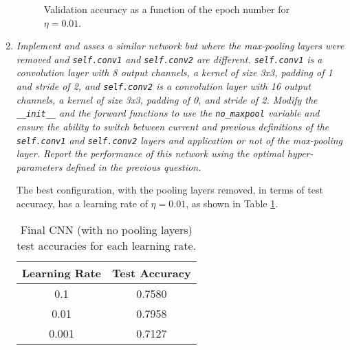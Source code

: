 \documentclass[12pt]{article}
\begin{document}
\begin{enumerate}[leftmargin=\labelsep]
          \begin{figure}[H]
              \centering
              
              \caption{Validation accuracy as a function of the epoch number for $\eta = 0.01$.}
              \label{fig:cnn-validation-accuracy-0.01-0.7-0-sgd-false}
          \end{figure}

    \item \textit{Implement and asses a similar network but where the max-pooling layers were removed and \texttt{self.conv1} and \texttt{self.conv2} are different. \texttt{self.conv1} is a convolution layer with 8 output channels, a kernel of size 3x3, padding of 1 and stride of 2, and \texttt{self.conv2} is a convolution layer with 16 output channels, a kernel of size 3x3, padding of 0, and stride of 2. Modify the \texttt{\_\_init\_\_} and the forward functions to use the \texttt{no\_maxpool} variable and ensure the ability to switch between current and previous definitions of the \texttt{self.conv1} and \texttt{self.conv2} layers and application or not of the max-pooling layer. Report the performance of this network using the optimal hyper-parameters defined in the previous question.}

          \vspace{12pt}

          The best configuration, with the pooling layers removed, in terms of test accuracy, has a learning rate of $\eta = 0.01$, as shown in Table \ref{tab:cnn-test-acc}.

          \begin{table}[H]
              \centering
              \begin{tabular}{|c|c|}
                  \hline
                  \textbf{Learning Rate} & \textbf{Test Accuracy} \\ \hline
                  0.1                    & 0.7580                 \\ \hline
                  0.01                   & 0.7958                 \\ \hline
                  0.001                  & 0.7127                 \\ \hline
              \end{tabular}
              \caption{Final CNN (with no pooling layers) test accuracies for each learning rate.}
              \label{tab:cnn-test-acc}
          \end{table}


\end{enumerate}
\end{document}
